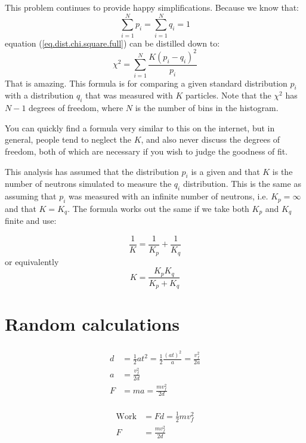 \documentclass[letterpaper,12pt]{article}
\begin{document}
This problem continues to provide happy simplifications. Because we know that:
\begin{equation}
\sum_{i=1}^{N}p_i=\sum_{i=1}^{N}q_i=1
\end{equation}
equation (\ref{eq.dist.chi.square.full}) can be distilled down to:
\begin{equation}
\chi^2=\sum_{i=1}^N\frac{K(p_i - q_i)^2}{p_i}
\end{equation}
That is amazing. This formula is for comparing a given standard distribution $p_i$ with a distribution $q_i$ that was measured with $K$ particles. Note that the $\chi^2$ has $N-1$ degrees of freedom, where $N$ is the number of bins in the histogram.

You can quickly find a formula very similar to this on the internet, but in general, people tend to neglect the $K$, and also never discuss the degrees of freedom, both of which are necessary if you wish to judge the goodness of fit.

This analysis has assumed that the distribution $p_i$ is a given and that $K$ is the number of neutrons simulated to measure the $q_i$ distribution. This is the same as assuming that $p_i$ was measured with an infinite number of neutrons, i.e. $K_p=\infty$ and that $K=K_q$. The formula works out the same if we take both $K_p$ and $K_q$ finite and use:

\begin{equation}
	\frac{1}{K}=\frac{1}{K_p}+\frac{1}{K_q}
\end{equation}
or equivalently
\begin{equation}
	K=\frac{K_pK_q}{K_p+K_q}
\end{equation}

\pagebreak

\section{Random calculations}

\begin{eqnarray}
\begin{aligned}
		d&=\frac{1}{2} at^2
		=\frac{1}{2} \frac{(at)^2}{a}
		=\frac{v_f^2}{2a}\\
		a&=\frac{v_f^2}{2d}\\
		F&=ma=\frac{m v_f^2}{2d}
\end{aligned}
\end{eqnarray}

\begin{eqnarray}
	\begin{aligned}
		\text{Work}&=Fd=\frac12 mv_f^2\\
		F&=\frac{m v_f^2}{2d}
	\end{aligned}
\end{eqnarray}
\end{document}
